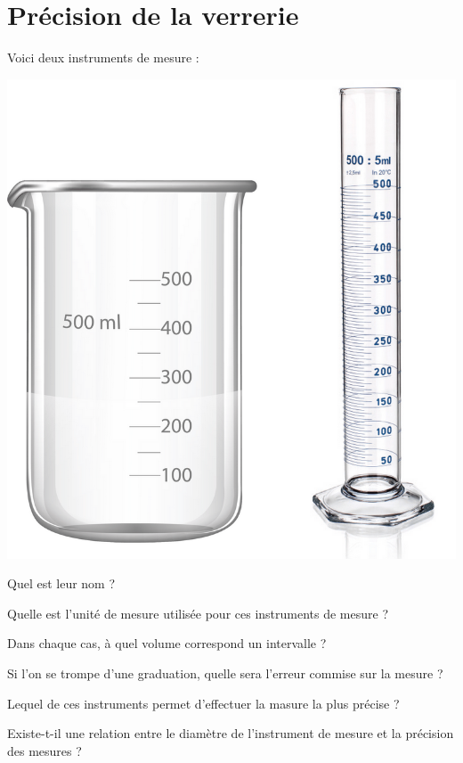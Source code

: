 \section{Précision de la verrerie}

Voici deux instruments de mesure :

\begin{center}
	\includegraphics[scale=0.3]{img/vol}
\end{center}

\begin{questions}
	\question[] Quel est leur nom ?

		\begin{solution}
			
		\end{solution}
	
	\question[] Quelle est l'unité de mesure utilisée pour ces instruments de mesure ?

	\question[] Dans chaque cas, à quel volume correspond un intervalle ?
	
	\question[] Si l'on se trompe d'une graduation, quelle sera l'erreur commise sur la mesure ?
	
	\question[] Lequel de ces instruments permet d'effectuer la masure la plus précise ?
	
	\question Existe-t-il une relation entre le diamètre de l'instrument de mesure et la précision des mesures ?

\end{questions}